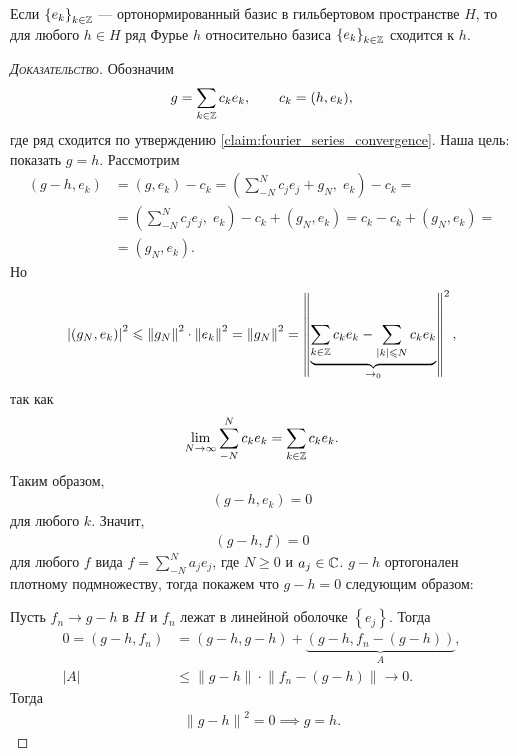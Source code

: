 \documentclass[../complex-analysis.tex]{subfiles}
\begin{document}
\begin{thm}
 Если $ \left\{e_k\right\}_{k \in \mathbb{Z}}  $ --- ортонормированный базис в гильбертовом пространстве $ H $, то для любого $ h \in H$ ряд Фурье $ h $ относительно базиса $ \left\{e_k\right\}_{k\in\mathbb{Z}}  $ сходится к $ h $.
\end{thm}
\begin{proof}[\normalfont\textsc{Доказательство}]
 Обозначим
 \begin{align*}
  g = \sum_{k\in\mathbb{Z}}c_ke_k,\qquad c_k=(h,e_k),
\end{align*} где ряд сходится по утверждению \eqref{claim:fourier_series_convergence}. Наша цель: показать $ g=h $. Рассмотрим
 \begin{align*}
  (g-h,e_k) &= (g,e_k) - c_k = \left(\sum_{-N}^{N}c_je_j + g_N,\; e_k \right) - c_k = \\
  &= \left( \sum_{-N}^{N}c_je_j,\;e_k \right) - c_k + (g_N,e_k) = c_k - c_k + (g_N,e_k) = \\
  &= (g_N,e_k).
 \end{align*} Но
 \begin{align*}
  \left| (g_N,e_k) \right|^{2} \leqslant \left\| g_N \right\|^{2} \cdot \left\| e_k \right\|^{2} = \left\| g_N \right\|^{2} = \left\| \underbrace{\sum_{k\in\mathbb{Z}}c_ke_k - \sum_{\left| k \right| \leqslant N} c_ke_k}_{\to_0} \right\|^{2},
 \end{align*} так как
 \begin{align*}
  \lim_{N \to \infty} \sum_{-N}^{N}c_ke_k = \sum_{k\in\mathbb{Z}}c_ke_k.
 \end{align*} Таким образом,
 \begin{align*}
  (g-h,e_k) = 0
 \end{align*} для любого $ k $. Значит,
 \begin{align*}
  (g-h,f) = 0
 \end{align*} для любого $ f $ вида $ f = \sum_{-N}^{N}a_je_j$, где $ N\geqslant 0 $ и $ a_j \in \mathbb{C} $. $ g-h $ ортогонален плотному подмножеству, тогда покажем что $g-h=0 $ следующим образом:

 Пусть $ f_n \to g-h $ в $ H $ и $ f_n $ лежат в линейной оболочке $ \left\{e_j\right\} $. Тогда
 \begin{align*}
	 0 = (g-h,f_n) &= (g-h,g-h) + \underbrace{(g-h,f_n - (g-h))}_A, \\
	 \left| A \right| &\leqslant \left\| g-h \right\| \cdot \left\| f_n - (g-h) \right\| \to 0.
 \end{align*} Тогда
 \begin{align*}
  \left\| g-h \right\|^{2} = 0 \implies g = h.
 \end{align*}
\end{proof}
\end{document}
